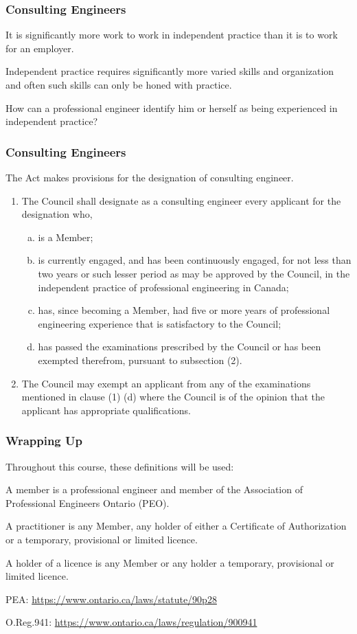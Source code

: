 \begin{frame}
\frametitle{Consulting Engineers}

It is significantly more work to work in independent practice than it is to work for an employer.

Independent practice requires significantly more varied skills and organization and often such skills can only be honed with practice.

How can a professional engineer identify him or herself as being experienced in independent practice?

\end{frame}



\begin{frame}
\frametitle{Consulting Engineers}

The Act makes provisions for the designation of consulting engineer.

\begin{enumerate}
\item The Council shall designate as a consulting engineer every applicant for the designation who,
\begin{enumerate}[(a)]
\item is a Member;
\item is currently engaged, and has been continuously engaged, for not less than two years or such lesser period as may be approved by the Council, in the independent practice of professional engineering in Canada;
\item has, since becoming a Member, had five or more years of professional engineering experience that is satisfactory to the Council;
\item has passed the examinations prescribed by the Council or has been exempted therefrom, pursuant to subsection (2).
\end{enumerate}
\item The Council may exempt an applicant from any of the examinations mentioned in clause (1) (d) where the Council is of the opinion that the applicant has appropriate qualifications.
\end{enumerate}

\end{frame}



\begin{frame}
\frametitle{Wrapping Up}

Throughout this course, these definitions will be used:

	A \alert{member} is a professional engineer and member of the Association of Professional Engineers Ontario (PEO).

	A \alert{practitioner} is any Member, any holder of either a Certificate of Authorization or a temporary, provisional or limited licence.

	A \alert{holder of a licence} is any Member or any holder a temporary, provisional or limited licence.

	PEA: \url{https://www.ontario.ca/laws/statute/90p28}
	
	O.Reg.941: \url{https://www.ontario.ca/laws/regulation/900941}

\end{frame}





